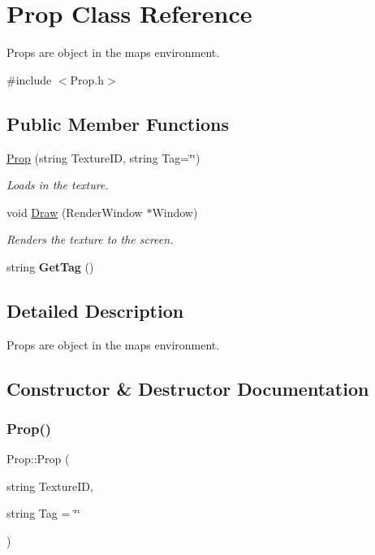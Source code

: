 \hypertarget{class_prop}{}\section{Prop Class Reference}
\label{class_prop}


Props are object in the maps environment.  




{\ttfamily \#include $<$Prop.\+h$>$}

\subsection*{Public Member Functions}
\begin{DoxyCompactItemize}
\item 
\hyperlink{class_prop_a4fae2e07c120d8d5a22e8e0e516a0cbd}{Prop} (string Texture\+ID, string Tag=\char`\"{}\char`\"{})
\begin{DoxyCompactList}\small\item\em Loads in the texture. \end{DoxyCompactList}\item 
void \hyperlink{class_prop_a55c4fb13383f6f5edc7b64066b0c2bc4}{Draw} (Render\+Window $\ast$Window)
\begin{DoxyCompactList}\small\item\em Renders the texture to the screen. \end{DoxyCompactList}\item 
\mbox{\label{class_prop_a1fdb0adb8f604a33f029bc24c66c9740}} 
string {\bfseries Get\+Tag} ()
\end{DoxyCompactItemize}


\subsection{Detailed Description}
Props are object in the maps environment. 



\subsection{Constructor \& Destructor Documentation}
\mbox{\label{class_prop_a4fae2e07c120d8d5a22e8e0e516a0cbd}} 
\subsubsection{\texorpdfstring{Prop()}{Prop()}}
{\footnotesize\ttfamily Prop\+::\+Prop (\begin{DoxyParamCaption}\item[{string}]{Texture\+ID,  }\item[{string}]{Tag = {\ttfamily \char`\"{}\char`\"{}} }\end{DoxyParamCaption})}



